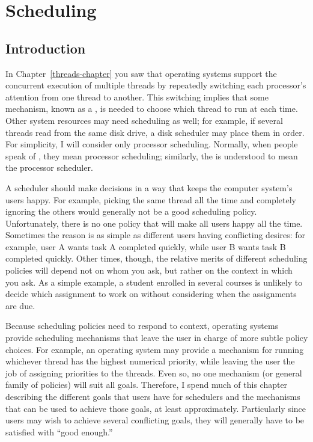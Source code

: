 \chapter{Scheduling}
\label{scheduling-chapter}
\section{Introduction}
In Chapter~\ref{threads-chapter} you saw that operating systems support the concurrent execution
of multiple threads by repeatedly switching each processor's attention
from one thread to another.  This switching implies that some mechanism, known
as a , is needed to choose which thread to run at each time.
Other system resources may need scheduling as well; for example, if
several threads read from the same disk drive, a disk
scheduler may place them in order.  For simplicity, I will consider
only processor scheduling.  Normally, when people speak of
, they mean processor scheduling;
similarly, the  is understood to mean the processor
scheduler.

A scheduler should make decisions in a way that keeps the computer
system's users happy.  For example, picking the same thread all the
time and completely ignoring the others would generally not be a good
scheduling policy.  Unfortunately, there is no one policy that will
make all users happy all the time.  Sometimes the reason is as simple as
different users having conflicting desires: for example, user A wants
task A completed quickly, while user B wants task B completed quickly.
Other times, though, the relative merits of different scheduling
policies will depend not on whom you ask, but rather on the context in
which you ask.  As a simple example, a student enrolled in several
courses is unlikely to decide which assignment to work on without
considering when the assignments are due.

Because scheduling policies need to respond to context, operating
systems provide scheduling
mechanisms that leave the user in charge of more subtle policy
choices.  For example, an operating system may provide a mechanism for
running whichever thread has the highest numerical priority, while
leaving the user the job of assigning priorities to the threads.  Even
so, no one mechanism (or general family of policies) will suit all
goals.  Therefore, I spend much of this chapter describing the
different goals that users have for schedulers and the mechanisms that
can be used to achieve those goals, at least approximately.
Particularly since users may wish to achieve several conflicting
goals, they will generally have to be satisfied with ``good enough.''

